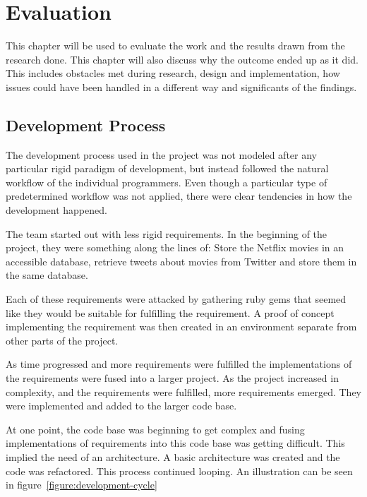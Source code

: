 
\chapter{Evaluation}

\minitoc

This chapter will be used to evaluate the work and the results drawn from the research done. This chapter will also discuss why the outcome ended up as it did. This includes obstacles met during research, design and implementation, how issues could have been handled in a different way and significants of the findings.

\clearpage


\section{Development Process}
The development process used in the project was not modeled after any particular rigid paradigm of development, but instead followed the natural workflow of the individual programmers. Even though a particular type of predetermined workflow was not applied, there were clear tendencies in how the development happened.

The team started out with less rigid requirements. In the beginning of the project, they were something along the lines of: Store the Netflix movies in an accessible database, retrieve tweets about movies from Twitter and store them in the same database.

Each of these requirements were attacked by gathering ruby gems that seemed like they would be suitable for fulfilling the requirement. A proof of concept implementing the requirement was then created in an environment separate from other parts of the project.

As time progressed and more requirements were fulfilled the implementations of the requirements were fused into a larger project. As the project increased in complexity, and the requirements were fulfilled, more requirements emerged. They were implemented and added to the larger code base.

At one point, the code base was beginning to get complex and fusing implementations of requirements into this code base was getting difficult. This implied the need of an architecture. A basic architecture was created and the code was refactored. This process continued looping. An illustration can be seen in figure~\ref{figure:development-cycle}

